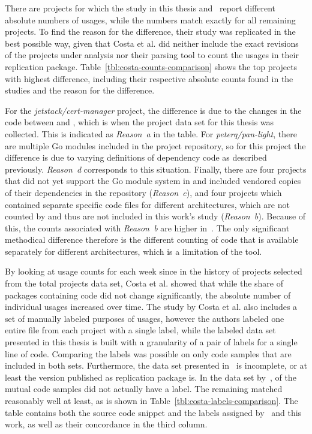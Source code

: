 There are  projects for which the study in this thesis and~\cite{costa2020} report different absolute
numbers of \unsafe{} usages, while the numbers match exactly for all remaining projects.
To find the reason for the difference, their study was replicated in the best possible way, given that Costa et al.
did neither include the exact revisions of the projects under analysis nor their parsing tool to count the \unsafe{}
usages in their replication package.
Table~\ref{tbl:costa-counts-comparison} shows the top  projects with highest difference, including their
respective absolute counts found in the studies and the reason for the difference.



For the \textit{jetstack/cert-manager} project, the difference is due to the changes in the code between
 and , which is when the project data set for this thesis was collected.
This is indicated as \textit{Reason~a} in the table.
For \textit{peterq/pan-light}, there are multiple Go modules included in the project repository, so for this project
the difference is due to varying definitions of dependency code as described previously.
\textit{Reason~d} corresponds to this situation.
Finally, there are four projects that did not yet support the Go module system in  and included
vendored copies of their dependencies in the repository (\textit{Reason~c}), and four projects which contained separate
specific code files for different architectures, which are not counted by \toolGeiger{} and thus are not included in
this work's study (\textit{Reason~b}).
Because of this, the counts associated with \textit{Reason~b} are higher in~\cite{costa2020}.
The only significant methodical difference therefore is the different counting of code that is available separately for
different architectures, which is a limitation of the \toolGeiger{} tool.

By looking at \unsafe{} usage counts for each week since  in the history of  projects
selected from the total projects data set, Costa et al. showed that while the share of packages containing \unsafe{}
code did not change significantly, the absolute number of individual \unsafe{} usages increased over time.
The study by Costa et al. also includes a set of manually labeled purposes of \unsafe{} usages, however the authors
labeled one entire file from each project with a single label, while the labeled data set presented in this thesis is
built with a granularity of a pair of labels for a single line of code.
Comparing the labels was possible on only  code samples that are included in both sets.
Furthermore, the data set presented in~\cite{costa2020} is incomplete, or at least the version published as replication
package is.
In the data set by~\cite{costa2020},  of the  mutual code samples did not actually have a
label.
The remaining  matched reasonably well at least, as is shown in Table~\ref{tbl:costa-labels-comparison}.
The table contains both the source code snippet and the labels assigned by~\cite{costa2020} and this work, as well as
their concordance in the third column.

